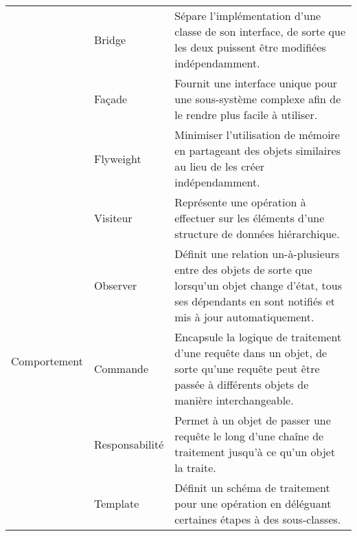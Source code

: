 \begin{minipage}[t]{1\textwidth}
\begin{table}[H]
\begin{adjustbox}{max width=\textwidth}
\begin{tabular}{l|p{7em}|p{38em}}
\cmidrule(lr){2-3}
& Bridge & Sépare l'implémentation d'une classe de son interface, de sorte que les deux puissent être modifiées indépendamment.\\
\cmidrule(lr){2-3}
& Façade & Fournit une interface unique pour une sous-système complexe afin de le rendre plus facile à utiliser.\\
\cmidrule(lr){2-3}
& Flyweight & Minimiser l'utilisation de mémoire en partageant des objets similaires au lieu de les créer indépendamment.\\
\midrule
\multirow{5}{*}{Comportement} 
& Visiteur & Représente une opération à effectuer sur les éléments d'une structure de données hiérarchique.\\
\cmidrule(lr){2-3}
& Observer & Définit une relation un-à-plusieurs entre des objets de sorte que lorsqu'un objet change d'état, tous ses dépendants en sont notifiés et mis à jour automatiquement.\\
\cmidrule(lr){2-3}
& Commande & Encapsule la logique de traitement d'une requête dans un objet, de sorte qu'une requête peut être passée à différents objets de manière interchangeable.\\
\cmidrule(lr){2-3}
& Responsabilité & Permet à un objet de passer une requête le long d'une chaîne de traitement jusqu'à ce qu'un objet la traite.\\
\cmidrule(lr){2-3}
& Template & Définit un schéma de traitement pour une opération en déléguant certaines étapes à des sous-classes.\\
\bottomrule
\end{tabular}
\end{adjustbox}
\end{table}
\end{minipage}

